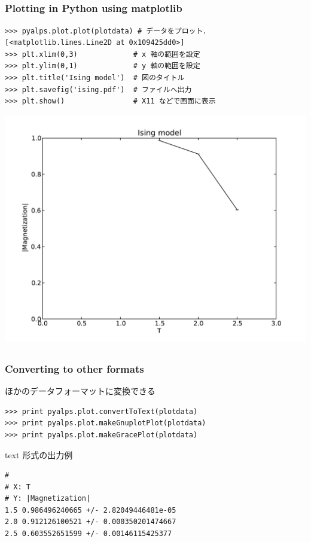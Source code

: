 \subsection*{\redm\whiteb\greenb}
\begin{frame}[t,fragile]
\frametitle{Plotting in Python using matplotlib}
\begin{lstlisting}
>>> pyalps.plot.plot(plotdata) # データをプロット．
[<matplotlib.lines.Line2D at 0x109425dd0>]
>>> plt.xlim(0,3)             # x 軸の範囲を設定
>>> plt.ylim(0,1)             # y 軸の範囲を設定
>>> plt.title('Ising model')  # 図のタイトル
>>> plt.savefig('ising.pdf')  # ファイルへ出力
>>> plt.show()                # X11 などで画面に表示
\end{lstlisting}
\includegraphics[scale=0.2]{ising.pdf}
\end{frame}

\subsection*{\redm\whiteb\greenb}
\begin{frame}[t,fragile]
\frametitle{Converting to other formats}
ほかのデータフォーマットに変換できる
\begin{lstlisting}
>>> print pyalps.plot.convertToText(plotdata)
>>> print pyalps.plot.makeGnuplotPlot(plotdata)
>>> print pyalps.plot.makeGracePlot(plotdata)
\end{lstlisting}

text 形式の出力例
\begin{lstlisting}
# 
# X: T
# Y: |Magnetization|
1.5	0.986496240665 +/- 2.82049446481e-05
2.0	0.912126100521 +/- 0.000350201474667
2.5	0.603552651599 +/- 0.00146115425377
\end{lstlisting}
\end{frame}


